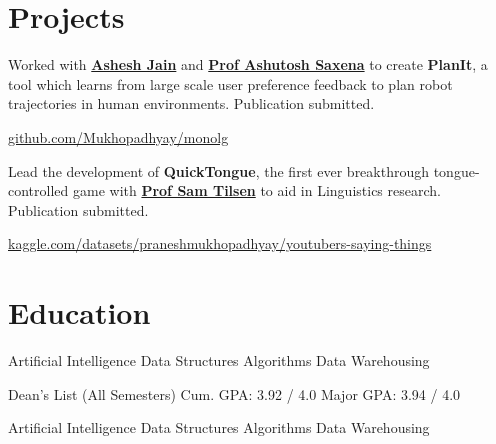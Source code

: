 \documentclass[]{deedy-resume-openfont}
\begin{document}
\sectionsep


\section{Projects}
Worked with \textbf{\href{http://www.cs.cornell.edu/~ashesh/}{Ashesh Jain}} and \textbf{\href{http://www.cs.cornell.edu/~asaxena/}{Prof Ashutosh Saxena}} to create \textbf{PlanIt}, a tool which  learns from large scale user preference feedback to plan robot trajectories in human environments.  Publication submitted.

\href{https://github.com/Mukhopadhyay/monolg}{ github.com/Mukhopadhyay/monolg}

\sectionsep

Lead the development of \textbf{QuickTongue}, the first ever breakthrough tongue-controlled game with \textbf{\href{http://conf.ling.cornell.edu/~tilsen/}{Prof Sam Tilsen}} to aid in Linguistics research. Publication submitted.

\href{https://www.kaggle.com/datasets/praneshmukhopadhyay/youtubers-saying-things}{ kaggle.com/datasets/praneshmukhopadhyay/youtubers-saying-things}

\sectionsep

\section{Education}

Artificial Intelligence \textbullet{} Data Structures \textbullet{} Algorithms \textbullet{} Data Warehousing
\sectionsep

Dean's List (All Semesters) \textbullet{}
Cum. GPA: 3.92 / 4.0 \textbullet{}
Major GPA: 3.94 / 4.0


Artificial Intelligence \textbullet{} Data Structures \textbullet{} Algorithms \textbullet{} Data Warehousing
\end{document}
